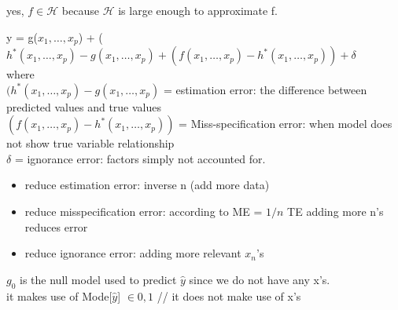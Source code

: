 \documentclass[12pt]{article}
\begin{document}
\begin{enumerate}
yes, $f \in \mathcal{H}$ because $\mathcal{H}$ is large enough to approximate f.



y = g($x_1, \ldots, x_p$) + ($h^*(x_1, \ldots, x_p)-g(x_1, \ldots, x_p)+(f(x_1, \ldots, x_p)-h^*(x_1, \ldots, x_p))+ \delta $ \\
where \\ 
$(h^*(x_1, \ldots, x_p)-g(x_1, \ldots, x_p)$ = estimation error: the difference between predicted values and true values \\
$(f(x_1, \ldots, x_p)-h^*(x_1, \ldots, x_p))$ = Miss-specification error: when model does not show true variable relationship \\
$\delta $ = ignorance error: factors simply not accounted for.


\begin{itemize}
  \item reduce estimation error: inverse n (add more data)
  \item reduce misspecification error: according to ME = $1/n$ TE adding more n's reduces error
  \item reduce ignorance error: adding more relevant $x_n$'s
\end{itemize}





$g_0$ is the null model used to predict $\hat{y}$ since we do not have any x's. \\
it makes use of Mode[$\hat{y}$] $ \in {0,1}$ //
it does not make use of x's



\end{enumerate}
\end{document}
